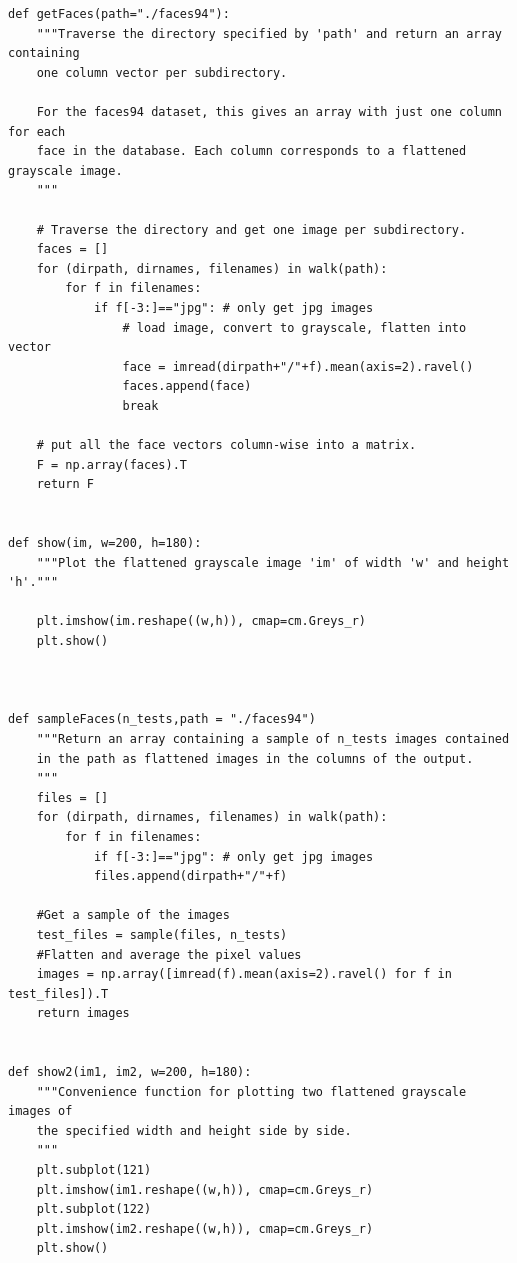 \begin{lstlisting}
def getFaces(path="./faces94"):
    """Traverse the directory specified by 'path' and return an array containing
    one column vector per subdirectory.
    
    For the faces94 dataset, this gives an array with just one column for each
    face in the database. Each column corresponds to a flattened grayscale image.
    """
    
    # Traverse the directory and get one image per subdirectory.
    faces = []
    for (dirpath, dirnames, filenames) in walk(path):
        for f in filenames:
            if f[-3:]=="jpg": # only get jpg images
                # load image, convert to grayscale, flatten into vector
                face = imread(dirpath+"/"+f).mean(axis=2).ravel() 
                faces.append(face)
                break
        
    # put all the face vectors column-wise into a matrix.
    F = np.array(faces).T
    return F


def show(im, w=200, h=180):
    """Plot the flattened grayscale image 'im' of width 'w' and height 'h'."""
    
    plt.imshow(im.reshape((w,h)), cmap=cm.Greys_r)
    plt.show()
    


def sampleFaces(n_tests,path = "./faces94")
    """Return an array containing a sample of n_tests images contained 
    in the path as flattened images in the columns of the output.
    """
    files = []
    for (dirpath, dirnames, filenames) in walk(path):
        for f in filenames:
            if f[-3:]=="jpg": # only get jpg images
            files.append(dirpath+"/"+f)
            
    #Get a sample of the images
    test_files = sample(files, n_tests)
    #Flatten and average the pixel values
    images = np.array([imread(f).mean(axis=2).ravel() for f in test_files]).T
    return images
    

def show2(im1, im2, w=200, h=180):
    """Convenience function for plotting two flattened grayscale images of
    the specified width and height side by side.
    """
    plt.subplot(121)
    plt.imshow(im1.reshape((w,h)), cmap=cm.Greys_r)
    plt.subplot(122)
    plt.imshow(im2.reshape((w,h)), cmap=cm.Greys_r)
    plt.show()


\end{lstlisting}

